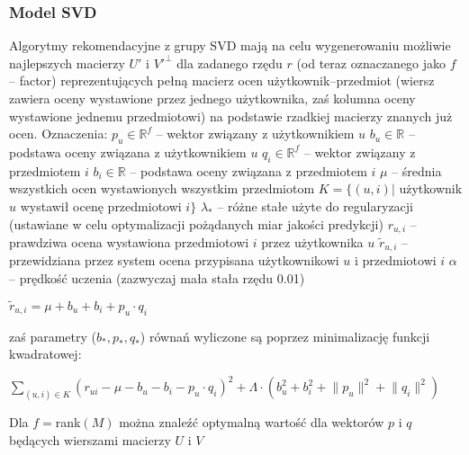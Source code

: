 \documentclass{pracamgr}
\begin{document}
    \subsubsection{Model SVD}
     Algorytmy rekomendacyjne z grupy SVD mają na celu wygenerowaniu możliwie
     najlepszych macierzy $U'$ i $V'^\bot$ dla zadanego rzędu $r$ (od teraz oznaczanego jako $f$ -- factor)
     reprezentujących pełną macierz ocen użytkownik--przedmiot
     (wiersz zawiera oceny wystawione przez jednego użytkownika, zaś kolumna oceny wystawione jednemu przedmiotowi)
     na podstawie rzadkiej macierzy znanych już ocen.\newline
     Oznaczenia:\newline
     $p_u\in\mathbb{R}^f$ -- wektor związany z użytkownikiem $u$\newline
     $b_u\in\mathbb{R}$ -- podstawa oceny związana z użytkownikiem $u$\newline
     $q_i\in\mathbb{R}^f$ -- wektor związany z przedmiotem $i$\newline
     $b_i\in\mathbb{R}$ -- podstawa oceny związana z przedmiotem $i$\newline
     $\mu$ -- średnia wszystkich ocen wystawionych wszystkim przedmiotom\newline
     $K=\{(u,i)|$ użytkownik $u$ wystawił ocenę przedmiotowi $i\}$\newline
     $\lambda_{*}$ -- różne stałe użyte do regularyzacji (ustawiane w celu optymalizacji pożądanych miar jakości predykcji)\newline 
     $r_{u,i}$ -- prawdziwa ocena wystawiona przedmiotowi $i$ przez użytkownika $u$\newline
     $\tilde{r}_{u,i}$ -- przewidziana przez system ocena przypisana użytkownikowi $u$ i przedmiotowi $i$\newline
     $\alpha$ -- prędkość uczenia (zazwyczaj mała stała rzędu 0.01)\newline
     \begin{center}
     $\tilde{r}_{u,i}=\mu+b_u+b_i+p_u\cdot q_i$
     \end{center}
     zaś parametry ($b_*,p_*,q_*$) równań wyliczone są poprzez minimalizację funkcji kwadratowej:
     \begin{center}
     $\sum\limits_{(u,i)\in K}(r_{ui}-\mu-b_u-b_i-p_u\cdot q_i)^2+\Lambda\cdot(b_u^2+b_i^2+\lVert p_u\rVert^2+\lVert q_i\rVert^2)$
     \end{center}
     Dla $f=$rank$(M)$ można znaleźć optymalną wartość dla wektorów $p$ i $q$ będących wierszami macierzy $U$ i $V$
\end{document}
